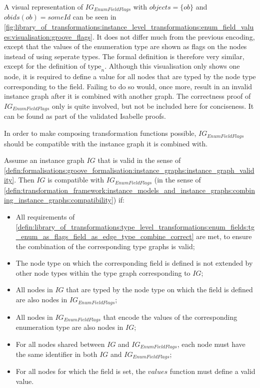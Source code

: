 A visual representation of $IG_{EnumFieldFlags}$ with $objects = \{ob\}$ and $obids(ob) = someId$ can be seen in \cref{fig:library_of_transformations:instance_level_transformations:enum_field_values:visualisation:groove_flags}. It does not differ much from the previous encoding, except that the values of the enumeration type are shown as flags on the nodes instead of using seperate types. The formal definition is therefore very similar, except for the definition of $\mathrm{type}_n$. Although this visualisation only shows one node, it is required to define a value for all nodes that are typed by the node type corresponding to the field. Failing to do so would, once more, result in an invalid instance graph after it is combined with another graph. The correctness proof of $IG_{EnumFieldFlags}$ only is quite involved, but not be included here for conciseness. It can be found as part of the validated Isabelle proofs.

In order to make composing transformation functions possible, $IG_{EnumFieldFlags}$ should be compatible with the instance graph it is combined with.

\begin{thm}
\label{defin:library_of_transformations:instance_level_transformations:enum_field_values:ig_enum_as_flags_field_as_edge_type_combine_correct}
Assume an instance graph $IG$ that is valid in the sense of \cref{defin:formalisations:groove_formalisation:instance_graphs:instance_graph_validity}. Then $IG$ is compatible with $IG_{EnumFieldFlags}$ (in the sense of \cref{defin:transformation_framework:instance_models_and_instance_graphs:combining_instance_graphs:compatibility}) if:
\begin{itemize}
    \item All requirements of \cref{defin:library_of_transformations:type_level_transformations:enum_fields:tg_enum_as_flags_field_as_edge_type_combine_correct} are met, to ensure the combination of the corresponding type graphs is valid;
    \item The node type on which the corresponding field is defined is not extended by other node types within the type graph corresponding to $IG$;
    \item All nodes in $IG$ that are typed by the node type on which the field is defined are also nodes in $IG_{EnumFieldFlags}$;
    \item All nodes in $IG_{EnumFieldFlags}$ that encode the values of the corresponding enumeration type are also nodes in $IG$;
    \item For all nodes shared between $IG$ and $IG_{EnumFieldFlags}$, each node must have the same identifier in both $IG$ and $IG_{EnumFieldFlags}$;
    \item For all nodes for which the field is set, the $values$ function must define a valid value.
\end{itemize}
\end{thm}

